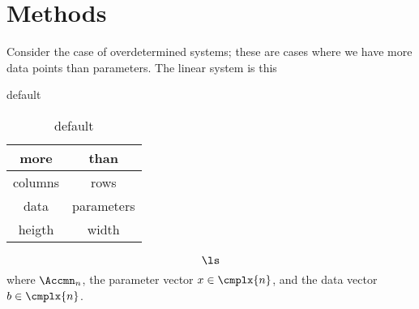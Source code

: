\section{Methods}

Consider the case of overdetermined systems; these are cases where we have more data points than parameters. The linear system is this
\begin{table}[htdp]
\caption{default}
\begin{center}
\begin{tabular}{cc}
more & than \\\hline
columns & rows \\
data & parameters \\
heigth & width \\
\end{tabular}
\end{center}
\label{tab:lsq:morethan}
\caption{default}
\end{table}%

\begin{equation*}
  \ls
\end{equation*}
where $\Accmn_{n}$, the parameter vector $x\in\cmplx{n}$, and the data vector $b\in\cmplx{n}$.



\endinput